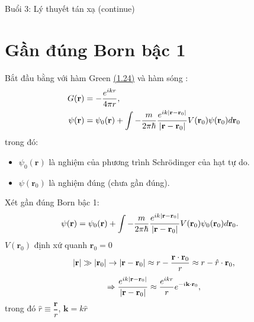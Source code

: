 \documentclass{report}
\newcommand{\f}[2]{\dfrac{#1}{#2}}
\begin{document}
		Buổi 3: Lý thuyết tán xạ (continue)
		\section{Gần đúng Born bậc 1}
		Bắt đầu bằng với hàm Green \hyperref[eq1.24]{(1.24)} và hàm sóng :
		\begin{align*}
			G(\mathbf{r})    & = - \f{e^{ikr}}{4\pi r},                                                                                                                                                     \\
			\psi(\mathbf{r}) & = \psi_0(\mathbf{r}) + \int -\f{m}{2\pi\hbar} \f{e^{ik\abs{\mathbf{r} - \mathbf{r}_0 } } }{\abs{\mathbf{r} - \mathbf{r}_0}} V(\mathbf{r}_0) \psi(\mathbf{r}_0) d\mathbf{r}_0
		\end{align*}
		trong đó:
		\begin{itemize}
			\item $\psi_0(\mathbf{r})$ là nghiệm của phương trình Schr\"{o}dinger của hạt tự do.
			\item $\psi(\mathbf{r}_0)$ là nghiệm đúng (chưa gần đúng).
		\end{itemize}

		Xét gần đúng Born bậc 1:
		\begin{align}
			\psi(\mathbf{r}) & = \psi_0(\mathbf{r}) + \int -\f{m}{2\pi\hbar} \f{e^{ik\abs{\mathbf{r} - \mathbf{r}_0 } } }{\abs{\mathbf{r} - \mathbf{r}_0}} V(\mathbf{r}_0) \psi_0(\mathbf{r}_0) d\mathbf{r}_0.
		\end{align}
	${V(\mathbf{r}_0)}$ định xứ quanh $\mathbf{r}_0 = 0$
		\begin{align}
			\abs{\mathbf{r}} \gg  \abs{\mathbf{r}_0} \rightarrow \abs{\mathbf{r} - \mathbf{r}_0 } \approx r - \f{\mathbf{r} \cdot \mathbf{r}_0 }{r} \approx r - \hat{r} \cdot \mathbf{r}_0,
		\end{align}
		\begin{align}
			\Rightarrow \f{e^{ik\abs{\mathbf{r} - \mathbf{r}_0 } } }{\abs{\mathbf{r} - \mathbf{r}_0}} \approx \f{e^{ikr}}{r} e^{-i\mathbf{k\cdot}\mathbf{r}_0 },
		\end{align}
		trong đó $\hat{r} \equiv \f{\mathbf{r}}{r}$, $\mathbf{k} = k \hat{r}$
\end{document}
